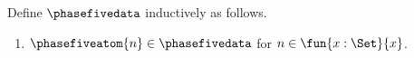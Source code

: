 \begin{datatype}\label{phase5_higher_order_data}
    Define $\phasefivedata$ inductively as follows.
    \begin{enumerate}
        \item $\phasefiveatom{n} \in \phasefivedata$
            for $n \in \fun{x:\Set}{x}$.
    \end{enumerate}
\end{datatype}
